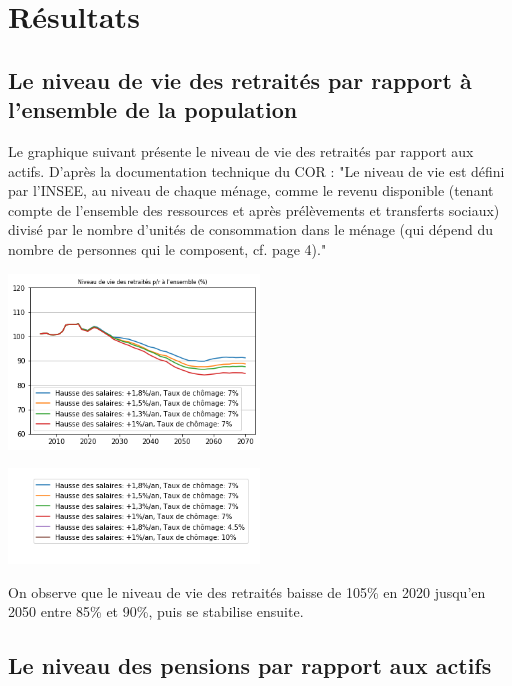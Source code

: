 \documentclass[10pt]{article}
\begin{document}

\section{Résultats}


\subsection{Le niveau de vie des retraités par rapport à l'ensemble de la population}

Le graphique suivant présente le niveau de vie des retraités par rapport aux 
actifs. 
D'après la documentation technique du COR : "Le niveau de vie est défini 
par l’INSEE, au niveau de chaque ménage, comme le revenu disponible (tenant
compte de l’ensemble des ressources et après prélèvements et transferts sociaux) 
divisé par le nombre d’unités de consommation dans le ménage 
(qui dépend du nombre de personnes qui le composent, cf. page 4)."

\begin{center}
\includegraphics[width=0.5\textwidth]{Simulation-RNV.png}

\includegraphics[width=0.5\textwidth]{Simulation-legende.png}
\end{center}

On observe que le niveau de vie des retraités 
baisse de 105\% en 2020 jusqu'en 2050 entre 85\% et 90\%, puis se stabilise ensuite. 


\subsection{Le niveau des pensions par rapport aux actifs}
\end{document}
